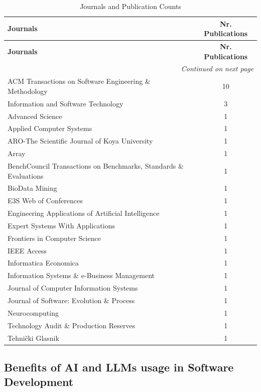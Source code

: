 {\small
\begin{longtable}{p{12cm} c}
\caption{Journals and Publication Counts}
\label{tab:journals} \\
\toprule
\textbf{Journals} & \textbf{Nr. Publications} \\
\midrule
\endfirsthead

\toprule
\textbf{Journals} & \textbf{Nr. Publications} \\
\midrule
\endhead

\midrule
\multicolumn{2}{r}{\textit{Continued on next page}} \\
\midrule
\endfoot

\bottomrule
\endlastfoot

\small
ACM Transactions on Software Engineering \& Methodology & 10 \\
Information and Software Technology & 3 \\
Advanced Science & 1 \\
Applied Computer Systems & 1 \\
ARO-The Scientific Journal of Koya University & 1 \\
Array & 1 \\
BenchCouncil Transactions on Benchmarks, Standards \& Evaluations & 1 \\
BioData Mining & 1 \\
E3S Web of Conferences & 1 \\
Engineering Applications of Artificial Intelligence & 1 \\
Expert Systems With Applications & 1 \\
Frontiers in Computer Science & 1 \\
IEEE Access & 1 \\
Informatica Economica & 1 \\
Information Systems \& e-Business Management & 1 \\
Journal of Computer Information Systems & 1 \\
Journal of Software: Evolution \& Process & 1 \\
Neurocomputing & 1 \\
Technology Audit \& Production Reserves & 1 \\
Tehnički Glasnik & 1 \\
\end{longtable}}


\subsection{Benefits of AI and LLMs usage in Software Development}

